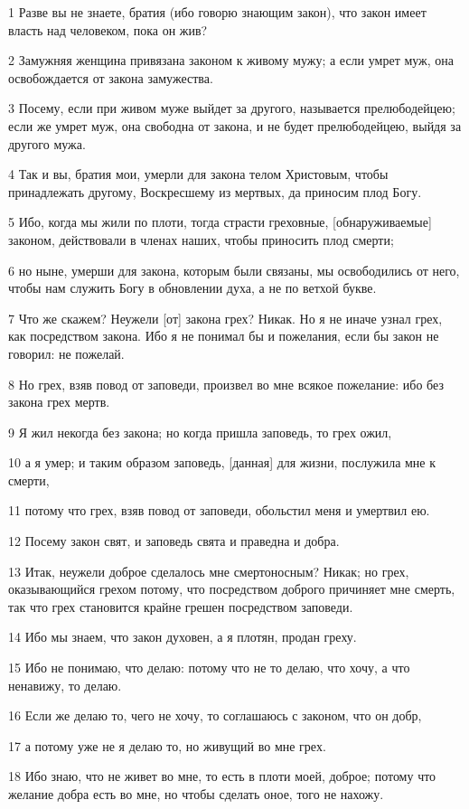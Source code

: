 \par 1 Разве вы не знаете, братия (ибо говорю знающим закон), что закон имеет власть над человеком, пока он жив?
\par 2 Замужняя женщина привязана законом к живому мужу; а если умрет муж, она освобождается от закона замужества.
\par 3 Посему, если при живом муже выйдет за другого, называется прелюбодейцею; если же умрет муж, она свободна от закона, и не будет прелюбодейцею, выйдя за другого мужа.
\par 4 Так и вы, братия мои, умерли для закона телом Христовым, чтобы принадлежать другому, Воскресшему из мертвых, да приносим плод Богу.
\par 5 Ибо, когда мы жили по плоти, тогда страсти греховные, [обнаруживаемые] законом, действовали в членах наших, чтобы приносить плод смерти;
\par 6 но ныне, умерши для закона, которым были связаны, мы освободились от него, чтобы нам служить Богу в обновлении духа, а не по ветхой букве.
\par 7 Что же скажем? Неужели [от] закона грех? Никак. Но я не иначе узнал грех, как посредством закона. Ибо я не понимал бы и пожелания, если бы закон не говорил: не пожелай.
\par 8 Но грех, взяв повод от заповеди, произвел во мне всякое пожелание: ибо без закона грех мертв.
\par 9 Я жил некогда без закона; но когда пришла заповедь, то грех ожил,
\par 10 а я умер; и таким образом заповедь, [данная] для жизни, послужила мне к смерти,
\par 11 потому что грех, взяв повод от заповеди, обольстил меня и умертвил ею.
\par 12 Посему закон свят, и заповедь свята и праведна и добра.
\par 13 Итак, неужели доброе сделалось мне смертоносным? Никак; но грех, оказывающийся грехом потому, что посредством доброго причиняет мне смерть, так что грех становится крайне грешен посредством заповеди.
\par 14 Ибо мы знаем, что закон духовен, а я плотян, продан греху.
\par 15 Ибо не понимаю, что делаю: потому что не то делаю, что хочу, а что ненавижу, то делаю.
\par 16 Если же делаю то, чего не хочу, то соглашаюсь с законом, что он добр,
\par 17 а потому уже не я делаю то, но живущий во мне грех.
\par 18 Ибо знаю, что не живет во мне, то есть в плоти моей, доброе; потому что желание добра есть во мне, но чтобы сделать оное, того не нахожу.
